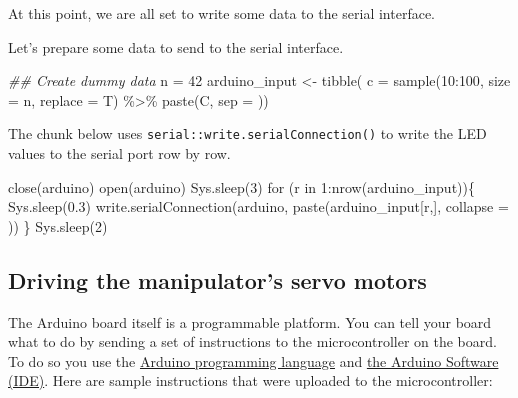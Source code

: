 \documentclass[
  letterpaper,
  DIV=11,
  numbers=noendperiod]{scrreprt}
\newenvironment{Shaded}{\begin{snugshade}}{\end{snugshade}}
\newcommand{\AttributeTok}[1]{\textcolor[rgb]{0.40,0.45,0.13}{#1}}
\newcommand{\ControlFlowTok}[1]{\textcolor[rgb]{0.00,0.23,0.31}{#1}}
\newcommand{\DecValTok}[1]{\textcolor[rgb]{0.68,0.00,0.00}{#1}}
\newcommand{\DocumentationTok}[1]{\textcolor[rgb]{0.37,0.37,0.37}{\textit{#1}}}
\newcommand{\FloatTok}[1]{\textcolor[rgb]{0.68,0.00,0.00}{#1}}
\newcommand{\FunctionTok}[1]{\textcolor[rgb]{0.28,0.35,0.67}{#1}}
\newcommand{\NormalTok}[1]{\textcolor[rgb]{0.00,0.23,0.31}{#1}}
\newcommand{\OtherTok}[1]{\textcolor[rgb]{0.00,0.23,0.31}{#1}}
\newcommand{\SpecialCharTok}[1]{\textcolor[rgb]{0.37,0.37,0.37}{#1}}
\newcommand{\StringTok}[1]{\textcolor[rgb]{0.13,0.47,0.30}{#1}}
\begin{document}
At this point, we are all set to write some data to the serial
interface.

Let's prepare some data to send to the serial interface.

\begin{Shaded}
\begin{Highlighting}[]
\DocumentationTok{\#\# Create dummy data}
\NormalTok{n }\OtherTok{=} \DecValTok{42}
\NormalTok{arduino\_input }\OtherTok{\textless{}{-}} \FunctionTok{tibble}\NormalTok{(}
  \AttributeTok{c =} \FunctionTok{sample}\NormalTok{(}\DecValTok{10}\SpecialCharTok{:}\DecValTok{100}\NormalTok{, }\AttributeTok{size =}\NormalTok{ n, }\AttributeTok{replace =}\NormalTok{ T) }\SpecialCharTok{\%\textgreater{}\%}
                     \FunctionTok{paste}\NormalTok{(}\StringTok{\textquotesingle{}C\textquotesingle{}}\NormalTok{, }\AttributeTok{sep =} \StringTok{\textquotesingle{}\textquotesingle{}}\NormalTok{))}
\end{Highlighting}
\end{Shaded}

The chunk below uses \texttt{serial::write.serialConnection()} to write
the LED values to the serial port row by row.

\begin{Shaded}
\begin{Highlighting}[]
\FunctionTok{close}\NormalTok{(arduino)}
\FunctionTok{open}\NormalTok{(arduino)}
\FunctionTok{Sys.sleep}\NormalTok{(}\DecValTok{3}\NormalTok{)}
\ControlFlowTok{for}\NormalTok{ (r }\ControlFlowTok{in} \DecValTok{1}\SpecialCharTok{:}\FunctionTok{nrow}\NormalTok{(arduino\_input))\{}
  \FunctionTok{Sys.sleep}\NormalTok{(}\FloatTok{0.3}\NormalTok{)}
  \FunctionTok{write.serialConnection}\NormalTok{(arduino, }\FunctionTok{paste}\NormalTok{(arduino\_input[r,], }\AttributeTok{collapse =} \StringTok{\textquotesingle{}\textquotesingle{}}\NormalTok{))}
\NormalTok{\}}
\FunctionTok{Sys.sleep}\NormalTok{(}\DecValTok{2}\NormalTok{)}
\end{Highlighting}
\end{Shaded}

\hypertarget{driving-the-manipulators-servo-motors}{%
\subsection{Driving the manipulator's servo
motors}\label{driving-the-manipulators-servo-motors}}

The Arduino board itself is a programmable platform. You can tell your
board what to do by sending a set of instructions to the microcontroller
on the board. To do so you use the
\href{https://www.arduino.cc/en/Reference/HomePage}{Arduino programming
language} and \href{https://www.arduino.cc/en/Main/Software}{the Arduino
Software (IDE)}. Here are sample instructions that were uploaded to the
microcontroller:
\end{document}
